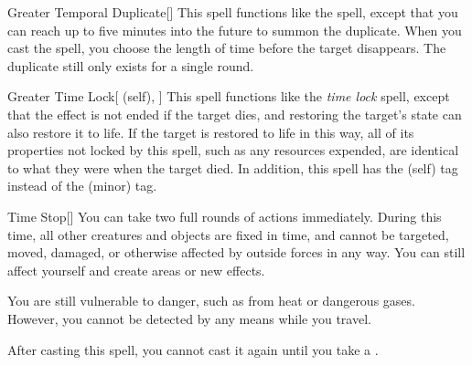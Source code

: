 \lowercase{\hypertarget{spell:Greater Temporal Duplicate}{}}\label{spell:Greater Temporal Duplicate}
\begin{freeability}[\nth{7}]{\hypertarget{spell:Greater Temporal Duplicate}{Greater Temporal Duplicate}}[]
This spell functions like the  spell, except that you can reach up to five minutes into the future to summon the duplicate.
When you cast the spell, you choose the length of time before the target disappears.
The duplicate still only exists for a single round.
\end{freeability}
\vspace{0.25em}



\lowercase{\hypertarget{spell:Greater Time Lock}{}}\label{spell:Greater Time Lock}
\begin{attuneability}[\nth{7}]{\hypertarget{spell:Greater Time Lock}{Greater Time Lock}}[ (self), ]
This spell functions like the \textit{time lock} spell, except that the effect is not ended if the target dies, and restoring the target's state can also restore it to life.
If the target is restored to life in this way, all of its properties not locked by this spell, such as any resources expended, are identical to what they were when the target died.
In addition, this spell has the  (self) tag instead of the  (minor) tag.
\end{attuneability}
\vspace{0.25em}



\lowercase{\hypertarget{spell:Time Stop}{}}\label{spell:Time Stop}
\begin{freeability}[\nth{7}]{\hypertarget{spell:Time Stop}{Time Stop}}[]
You can take two full rounds of actions immediately.
During this time, all other creatures and objects are fixed in time, and cannot be targeted, moved, damaged, or otherwise affected by outside forces in any way.
You can still affect yourself and create areas or new effects.

You are still vulnerable to danger, such as from heat or dangerous gases.
However, you cannot be detected by any means while you travel.

After casting this spell, you cannot cast it again until you take a .
\end{freeability}
\vspace{0.25em}



